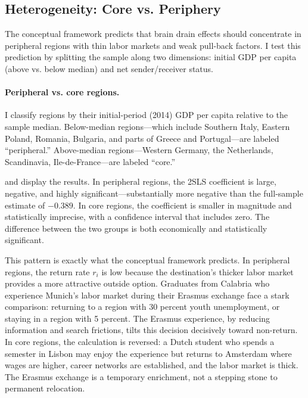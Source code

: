 \documentclass[12pt]{article}
\begin{document}
\subsection{Heterogeneity: Core vs. Periphery}
\label{sec:heterogeneity}

The conceptual framework predicts that brain drain effects should concentrate in peripheral regions with thin labor markets and weak pull-back factors. I test this prediction by splitting the sample along two dimensions: initial GDP per capita (above vs. below median) and net sender/receiver status.

\paragraph{Peripheral vs. core regions.} I classify regions by their initial-period (2014) GDP per capita relative to the sample median. Below-median regions---which include Southern Italy, Eastern Poland, Romania, Bulgaria, and parts of Greece and Portugal---are labeled ``peripheral.'' Above-median regions---Western Germany, the Netherlands, Scandinavia, Ile-de-France---are labeled ``core.''

 and  display the results. In peripheral regions, the 2SLS coefficient is large, negative, and highly significant---substantially more negative than the full-sample estimate of $-0.389$. In core regions, the coefficient is smaller in magnitude and statistically imprecise, with a confidence interval that includes zero. The difference between the two groups is both economically and statistically significant.

This pattern is exactly what the conceptual framework predicts. In peripheral regions, the return rate $r_i$ is low because the destination's thicker labor market provides a more attractive outside option. Graduates from Calabria who experience Munich's labor market during their Erasmus exchange face a stark comparison: returning to a region with 30 percent youth unemployment, or staying in a region with 5 percent. The Erasmus experience, by reducing information and search frictions, tilts this decision decisively toward non-return. In core regions, the calculation is reversed: a Dutch student who spends a semester in Lisbon may enjoy the experience but returns to Amsterdam where wages are higher, career networks are established, and the labor market is thick. The Erasmus exchange is a temporary enrichment, not a stepping stone to permanent relocation.
\end{document}
